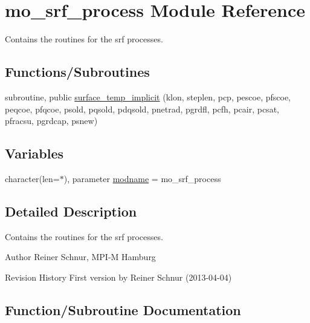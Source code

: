 \hypertarget{namespacemo__srf__process}{}\section{mo\+\_\+srf\+\_\+process Module Reference}
\label{namespacemo__srf__process}


Contains the routines for the srf processes.  


\subsection*{Functions/\+Subroutines}
\begin{DoxyCompactItemize}
\item 
subroutine, public \hyperlink{namespacemo__srf__process_aa120db81e24075287f867d3958eca237}{surface\+\_\+temp\+\_\+implicit} (klon, steplen, pcp, pescoe, pfscoe, peqcoe, pfqcoe, psold, pqsold, pdqsold, pnetrad, pgrdfl, pcfh, pcair, pcsat, pfracsu, pgrdcap, psnew)
\end{DoxyCompactItemize}
\subsection*{Variables}
\begin{DoxyCompactItemize}
\item 
character(len=$\ast$), parameter \hyperlink{namespacemo__srf__process_a74a1ddcea9503b7ef5d8ac1d52d3b3b4}{modname} = \textquotesingle{}mo\+\_\+srf\+\_\+process\textquotesingle{}
\end{DoxyCompactItemize}


\subsection{Detailed Description}
Contains the routines for the srf processes. 

\begin{DoxyAuthor}{Author}
Reiner Schnur, M\+P\+I-\/\+M Hamburg
\end{DoxyAuthor}
\begin{DoxyParagraph}{Revision History}
First version by Reiner Schnur (2013-\/04-\/04) 
\end{DoxyParagraph}


\subsection{Function/\+Subroutine Documentation}
\hypertarget{namespacemo__srf__process_aa120db81e24075287f867d3958eca237}{}
